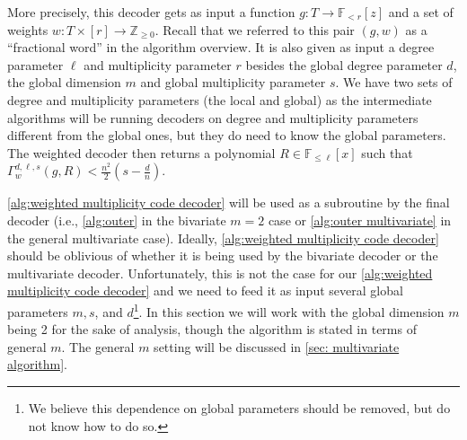 \documentclass{article}
\def\Integer{\mathbb{Z}}
\def\Field{\mathbb{F}}
\let\Z\Integer
\let\F\Field
\begin{document}
	More precisely, this decoder gets as input a function $g\colon T \to
	\F_{<r}[z]$ and a set of weights $w\colon T \times [r] \to \Z_{\geq
		0}$. Recall that we referred to this pair $(g,w)$ as a ``fractional word'' in
	the algorithm overview. It is also given as input a degree parameter
	$\ell$ and multiplicity parameter $r$ besides the global degree
	parameter $d$, the global dimension $m$ and global multiplicity parameter $s$. We have two
	sets of degree and multiplicity parameters (the local and global) as
	the intermediate algorithms will be running decoders on degree and
	multiplicity parameters different from the global ones, but they
	do need to know the global parameters. The weighted decoder
	then returns a polynomial $R \in \F_{\leq \ell}[x]$ such that
	$\Gamma_w^{d, \ell, s}(g, R) < \frac{n^2}{2}\left(s - \frac{d}{n}\right)$.
	
	\cref{alg:weighted multiplicity code decoder} will be used as a subroutine by the final decoder (i.e., \cref{alg:outer} in the bivariate $m=2$ case or \cref{alg:outer multivariate} in the general multivariate case). Ideally, \cref{alg:weighted multiplicity code decoder} should be oblivious of whether it is being used by the bivariate decoder or the multivariate decoder. Unfortunately, this is not the case for our \cref{alg:weighted multiplicity code decoder} and we need to feed it as input several global parameters $m, s$, and $d$\footnote{We believe this dependence on global parameters should be removed, but do not know how to do so.}. In this section we will work with the global dimension $m$ being 2 for the sake of analysis, though the algorithm is stated in terms of general $m$. The general $m$ setting will be discussed in \cref{sec: multivariate algorithm}.
	
	
\end{document}
